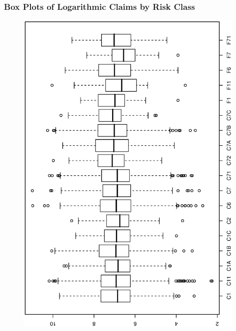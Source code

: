 \begin{frame}[shrink=2]
 \frametitle{Box Plots of Logarithmic Claims by Risk Class}

\begin{figure}[htp]
  \begin{center}
    \includegraphics[width=1\textwidth,angle=270,scale=0.5]{Chapter4/Fig4BoxplotAuto.ps}
  \end{center}
\end{figure}
\end{frame}


